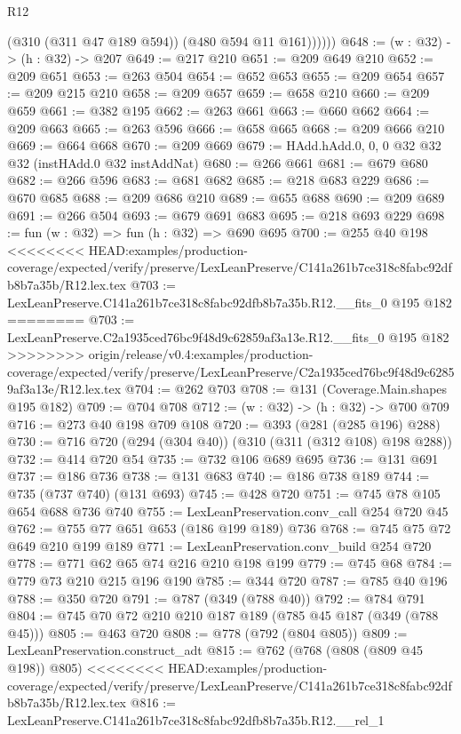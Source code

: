 \begin{lexlean}{R12}
\begin{coremodule}
{{{{{{{{              (@310 (@311 @47 @189 @594))
              (@480 @594 @11 @161))))))
@648 := (w : @32) -> (h : @32) -> @207
@649 := @217 @210
@651 := @209 @649 @210
@652 := @209 @651
@653 := @263 @504
@654 := @652 @653
@655 := @209 @654
@657 := @209 @215 @210
@658 := @209 @657
@659 := @658 @210
@660 := @209 @659
@661 := @382 @195
@662 := @263 @661
@663 := @660 @662
@664 := @209 @663
@665 := @263 @596
@666 := @658 @665
@668 := @209 @666 @210
@669 := @664 @668
@670 := @209 @669
@679 := HAdd.hAdd.{0, 0, 0} @32 @32 @32 (instHAdd.{0} @32 instAddNat)
@680 := @266 @661
@681 := @679 @680
@682 := @266 @596
@683 := @681 @682
@685 := @218 @683 @229
@686 := @670 @685
@688 := @209 @686 @210
@689 := @655 @688
@690 := @209 @689
@691 := @266 @504
@693 := @679 @691 @683
@695 := @218 @693 @229
@698 := fun (w : @32) => fun (h : @32) => @690 @695
@700 := @255 @40 @198
<<<<<<<< HEAD:examples/production-coverage/expected/verify/preserve/LexLeanPreserve/C141a261b7ce318c8fabc92dfb8b7a35b/R12.lex.tex
@703 := LexLeanPreserve.C141a261b7ce318c8fabc92dfb8b7a35b.R12.__fits_0 @195 @182
========
@703 := LexLeanPreserve.C2a1935ced76bc9f48d9c62859af3a13e.R12.__fits_0 @195 @182
>>>>>>>> origin/release/v0.4:examples/production-coverage/expected/verify/preserve/LexLeanPreserve/C2a1935ced76bc9f48d9c62859af3a13e/R12.lex.tex
@704 := @262 @703
@708 := @131 (Coverage.Main.shapes @195 @182)
@709 := @704 @708
@712 := (w : @32) -> (h : @32) -> @700 @709
@716 := @273 @40 @198 @709 @108
@720 := @393 (@281 (@285 @196) @288)
@730 := @716 @720 (@294 (@304 @40)) (@310 (@311 (@312 @108) @198 @288))
@732 := @414 @720 @54
@735 := @732 @106 @689 @695
@736 := @131 @691
@737 := @186 @736
@738 := @131 @683
@740 := @186 @738 @189
@744 := @735 (@737 @740) (@131 @693)
@745 := @428 @720
@751 := @745 @78 @105 @654 @688 @736 @740
@755 := LexLeanPreservation.conv_call @254 @720 @45
@762 := @755 @77 @651 @653 (@186 @199 @189) @736
@768 := @745 @75 @72 @649 @210 @199 @189
@771 := LexLeanPreservation.conv_build @254 @720
@778 := @771 @62 @65 @74 @216 @210 @198 @199
@779 := @745 @68
@784 := @779 @73 @210 @215 @196 @190
@785 := @344 @720
@787 := @785 @40 @196
@788 := @350 @720
@791 := @787 (@349 (@788 @40))
@792 := @784 @791
@804 := @745 @70 @72 @210 @210 @187 @189 (@785 @45 @187 (@349 (@788 @45)))
@805 := @463 @720
@808 := @778 (@792 (@804 @805))
@809 := LexLeanPreservation.construct_adt
@815 := @762 (@768 (@808 (@809 @45 @198)) @805)
<<<<<<<< HEAD:examples/production-coverage/expected/verify/preserve/LexLeanPreserve/C141a261b7ce318c8fabc92dfb8b7a35b/R12.lex.tex
@816 := LexLeanPreserve.C141a261b7ce318c8fabc92dfb8b7a35b.R12.__rel_1
}}}}}}}}
\end{coremodule}
\end{lexlean}

